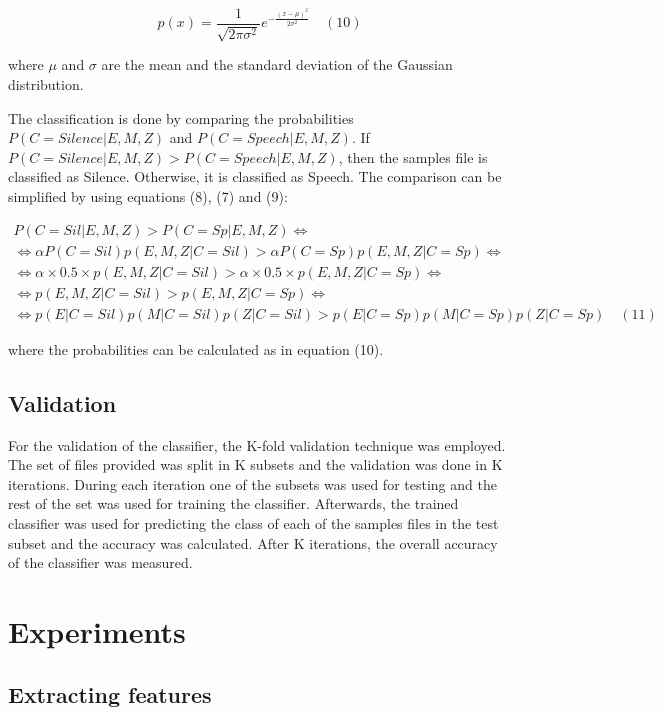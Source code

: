 \documentclass{article}
\begin{document}
\[
  p(x) = \frac{1}{\sqrt{2{\pi}\sigma^2}} e^{-\frac{(x-\mu)^2}{2\sigma^2}} \quad (10)
\]

where \(\mu\) and \(\sigma\) are the mean and the standard deviation of the Gaussian distribution.


The classification is done by comparing the probabilities \(P(C=Silence|E,M,Z)\) and \(P(C=Speech|E,M,Z)\). 
If \(P(C=Silence|E,M,Z) > P(C=Speech|E,M,Z)\), then the samples file is classified as Silence. 
Otherwise, it is classified as Speech. 
The comparison can be simplified by using equations (8), (7) and (9):

\begin{gather*}
  P(C=Sil|E,M,Z) > P(C=Sp|E,M,Z) \iff \\
  \iff \alpha{P}(C=Sil)p(E,M,Z|C=Sil) > \alpha{P}(C=Sp)p(E,M,Z|C=Sp) \iff \\
  \iff \alpha \times 0.5 \times p(E,M,Z|C=Sil) > \alpha \times 0.5 \times p(E,M,Z|C=Sp) \iff \\
  \iff p(E,M,Z|C=Sil) > p(E,M,Z|C=Sp) \iff \\
  \iff p(E|C=Sil)p(M|C=Sil)p(Z|C=Sil) > p(E|C=Sp)p(M|C=Sp)p(Z|C=Sp) \quad (11)
\end{gather*}

where the probabilities can be calculated as in equation (10).

\subsection{Validation}
\label{the_valid}

For the validation of the classifier, the K-fold validation technique was employed.
The set of files provided was split in K subsets and the validation was done in K iterations.
During each iteration one of the subsets was used for testing and the rest of the set was used for training the classifier. 
Afterwards, the trained classifier was used for predicting the class of each of the samples files in the test subset and the accuracy was calculated.
After K iterations, the overall accuracy of the classifier was measured.


\section{Experiments}
\label{exp}

\subsection{Extracting features} %
\end{document}
